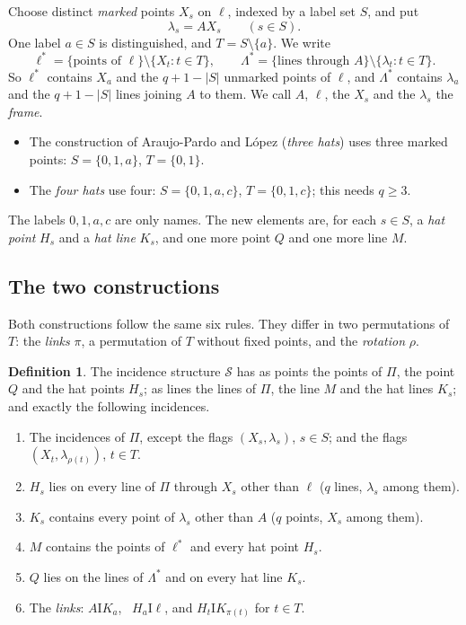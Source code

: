 \documentclass[11pt]{amsart}
\theoremstyle{definition}
\newtheorem{definition}[theorem]{Definition}
\theoremstyle{remark}
\newcommand{\I}{\mathrel{\mathrm{I}}}
\newcommand{\cS}{\mathcal{S}}
\newcommand{\lam}{\lambda}
\begin{document}
Choose distinct \emph{marked} points $X_s$ on $\ell$, indexed by a label set $S$, and put
\[
\lam_s = AX_s \qquad (s\in S).
\]
One label $a\in S$ is distinguished, and $T=S\setminus\{a\}$. We write
\[
\ell^* = \{\text{points of } \ell\}\setminus\{X_t : t\in T\},\qquad \Lambda^* = \{\text{lines through } A\}\setminus\{\lam_t: t\in T\}.
\]
So $\ell^*$ contains $X_a$ and the $q+1-|S|$ unmarked points of $\ell$, and $\Lambda^*$ contains $\lam_a$ and the $q+1-|S|$ lines joining $A$ to them. We call $A$, $\ell$, the $X_s$ and the $\lam_s$ the \emph{frame}.

\begin{itemize}[leftmargin=1.5em]
\item The construction of Araujo-Pardo and L\'opez \cite{AL20} (\emph{three hats}) uses three marked points: $S=\{0,1,a\}$, $T=\{0,1\}$.
\item The \emph{four hats} use four: $S=\{0,1,a,c\}$, $T=\{0,1,c\}$; this needs $q\ge 3$.
\end{itemize}
The labels $0,1,a,c$ are only names. The new elements are, for each $s\in S$, a \emph{hat point} $H_s$ and a \emph{hat line} $K_s$, and one more point $Q$ and one more line $M$.

\subsection{The two constructions}\label{ssec:defs}
Both constructions follow the same six rules. They differ in two permutations of $T$: the \emph{links} $\pi$, a permutation of $T$ without fixed points, and the \emph{rotation} $\rho$.

\begin{definition}\label{def:hats}
The incidence structure $\cS$ has as points the points of $\Pi$, the point $Q$ and the hat points $H_s$; as lines the lines of $\Pi$, the line $M$ and the hat lines $K_s$; and exactly the following incidences.
\begin{enumerate}[label=\textup{(R\arabic*)},leftmargin=3em]
\item\label{r:plane} The incidences of $\Pi$, except the flags $(X_s,\lam_s)$, $s\in S$; and the flags $(X_t,\lam_{\rho(t)})$, $t\in T$.
\item\label{r:hat} $H_s$ lies on every line of $\Pi$ through $X_s$ other than $\ell$ \quad ($q$ lines, $\lam_s$ among them).
\item\label{r:hatline} $K_s$ contains every point of $\lam_s$ other than $A$ \quad ($q$ points, $X_s$ among them).
\item\label{r:M} $M$ contains the points of $\ell^*$ and every hat point $H_s$.
\item\label{r:Q} $Q$ lies on the lines of $\Lambda^*$ and on every hat line $K_s$.
\item\label{r:links} The \emph{links}: $A\I K_a$, \ $H_a\I\ell$, and $H_t\I K_{\pi(t)}$ for $t\in T$.
\end{enumerate}
\end{definition}
\end{document}
